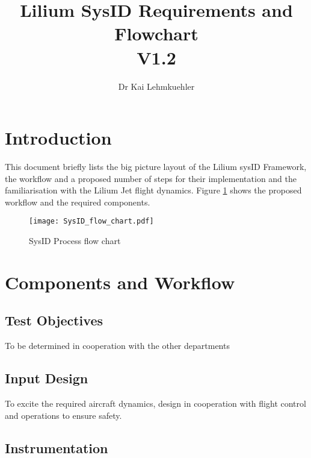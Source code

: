 \documentclass[11pt,a4paper]{article}
\author{Dr Kai Lehmkuehler}
\title{Lilium SysID Requirements and Flowchart\\ V1.2}
\begin{document}
\maketitle
\tableofcontents

\clearpage
\section{Introduction}
This document briefly lists the big picture layout of the Lilium sysID Framework, the workflow and a proposed number of steps for their implementation and the familiarisation with the Lilium Jet flight dynamics. Figure \ref{flowchart} shows the proposed workflow and the required components.

\begin{figure}[!ht]
\center
\texttt{[image: SysID\_flow\_chart.pdf]}
\caption{SysID Process flow chart}
\label{flowchart}
\end{figure}

\clearpage
\section{Components and Workflow}

\subsection{Test Objectives}
To be determined in cooperation with the other departments

\subsection{Input Design}
To excite the required aircraft dynamics, design in cooperation with flight control and operations to ensure safety.

\subsection{Instrumentation}
\end{document}
